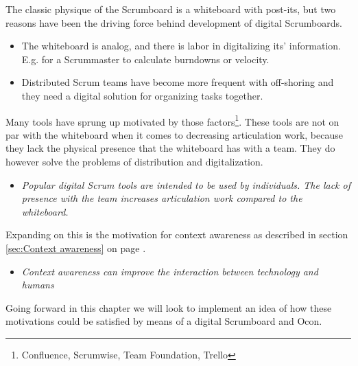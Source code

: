 \documentclass[../report.tex]{subfiles}
\begin{document}
The classic physique of the Scrumboard is a whiteboard with post-its, but two reasons have been the driving force behind development of digital Scrumboards.

\begin{itemize}
\item The whiteboard is analog, and there is labor in digitalizing its' information. E.g. for a Scrummaster to calculate burndowns or velocity.
\item Distributed Scrum teams have become more frequent with off-shoring and they need a digital solution for organizing tasks together.
\end{itemize}

Many tools have sprung up motivated by those factors\footnote{Confluence, Scrumwise, Team Foundation, Trello}. These tools are not on par with the whiteboard when it comes to decreasing articulation work, because they lack the physical presence that the whiteboard has with a team. They do however solve the problems of distribution and digitalization.

\begin{itemize}
\item[\textbf{Motivation 1}] \textit{Popular digital Scrum tools are intended to be used by individuals. The lack of presence with the team increases articulation work compared to the whiteboard.}
\end{itemize}

Expanding on this is the motivation for context awareness as described in section \ref{sec:Context awareness} on page \pageref{sec:Context awareness}.

\begin{itemize}
\item[\textbf{Motivation 2}] \textit{Context awareness can improve the interaction between technology and humans}
\end{itemize}


Going forward in this chapter we will look to implement an idea of how these motivations could be satisfied by means of a digital Scrumboard and Ocon.




\end{document}
